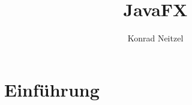 \documentclass[10pt,a4paper]{book}
\title{JavaFX}
\author{Konrad Neitzel}
\begin{document}
\parindent 0pt
\maketitle
\chapter{Einführung}


\end{document}
